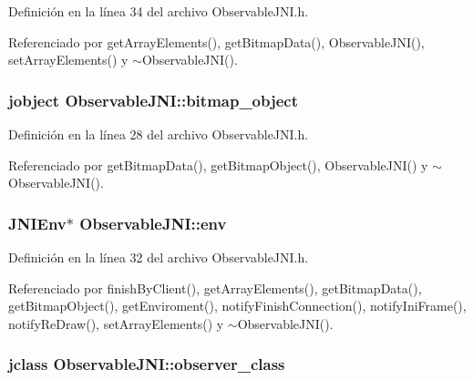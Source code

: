 Definición en la línea 34 del archivo Observable\-J\-N\-I.\-h.



Referenciado por get\-Array\-Elements(), get\-Bitmap\-Data(), Observable\-J\-N\-I(), set\-Array\-Elements() y $\sim$\-Observable\-J\-N\-I().

\hypertarget{classObservableJNI_ab10266460395b3a80d8e64467b54119b}{
\subsubsection[{bitmap\-\_\-object}]{\setlength{\rightskip}{0pt plus 5cm}jobject Observable\-J\-N\-I\-::bitmap\-\_\-object\hspace{0.3cm}{\ttfamily [private]}}}\label{classObservableJNI_ab10266460395b3a80d8e64467b54119b}


Definición en la línea 28 del archivo Observable\-J\-N\-I.\-h.



Referenciado por get\-Bitmap\-Data(), get\-Bitmap\-Object(), Observable\-J\-N\-I() y $\sim$\-Observable\-J\-N\-I().

\hypertarget{classObservableJNI_a8d0b0f613e2cff5fa51cd9fcfc161d3f}{
\subsubsection[{env}]{\setlength{\rightskip}{0pt plus 5cm}J\-N\-I\-Env$\ast$ Observable\-J\-N\-I\-::env\hspace{0.3cm}{\ttfamily [private]}}}\label{classObservableJNI_a8d0b0f613e2cff5fa51cd9fcfc161d3f}


Definición en la línea 32 del archivo Observable\-J\-N\-I.\-h.



Referenciado por finish\-By\-Client(), get\-Array\-Elements(), get\-Bitmap\-Data(), get\-Bitmap\-Object(), get\-Enviroment(), notify\-Finish\-Connection(), notify\-Ini\-Frame(), notify\-Re\-Draw(), set\-Array\-Elements() y $\sim$\-Observable\-J\-N\-I().

\hypertarget{classObservableJNI_ab6114ef78b80e3c0942207c6c7c91283}{
\subsubsection[{observer\-\_\-class}]{\setlength{\rightskip}{0pt plus 5cm}jclass Observable\-J\-N\-I\-::observer\-\_\-class\hspace{0.3cm}{\ttfamily [private]}}}\label{classObservableJNI_ab6114ef78b80e3c0942207c6c7c91283}



